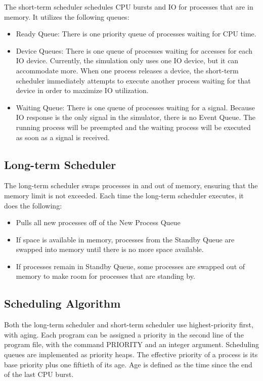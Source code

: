 \documentclass[paper=a4, fontsize=11pt]{scrartcl} %
\numberwithin{equation}{section} %
\numberwithin{figure}{section} %
\numberwithin{table}{section} %
\begin{document}
The short-term scheduler schedules CPU bursts and IO for processes that are in memory. It utilizes the following queues:
\begin{itemize}
	\item Ready Queue: There is one priority queue of processes waiting for CPU time.
           \item Device Queues: There is one queue of processes waiting for accesses for each IO device. 
Currently, the simulation only uses one IO device, but it can accommodate more. When one process releases
a device, the short-term scheduler immediately attempts to execute another process waiting for that device in order to
maximize IO utilization.
	\item Waiting Queue: There is one queue of processes waiting for a signal. Because IO response is the only signal in the
simulator, there is no Event Queue. The running process will be preempted and the waiting process will be executed as soon as a signal is received.

\end{itemize}

\subsection{Long-term Scheduler}

The long-term scheduler swaps processes in and out of memory, ensuring that the memory limit is not exceeded. Each time the long-term scheduler executes, it does the following:
\begin{itemize}
	\item Pulls all new processes off of the New Process Queue
           \item If space is available in memory, processes from the Standby Queue are swapped into memory until there is no more space available.
	\item If processes remain in Standby Queue, some processes are swapped out of memory to make room for processes that are standing by.

\end{itemize}

\subsection{Scheduling Algorithm}
Both the long-term scheduler and short-term scheduler use highest-priority first, with aging. Each program can be assigned a priority in the second line of the program file, with the command PRIORITY and an integer argument. Scheduling queues are implemented as priority heaps. The effective priority of a process is its base priority plus one fiftieth of its age. Age is defined as the time since the end of the last CPU burst. 
\end{document}

